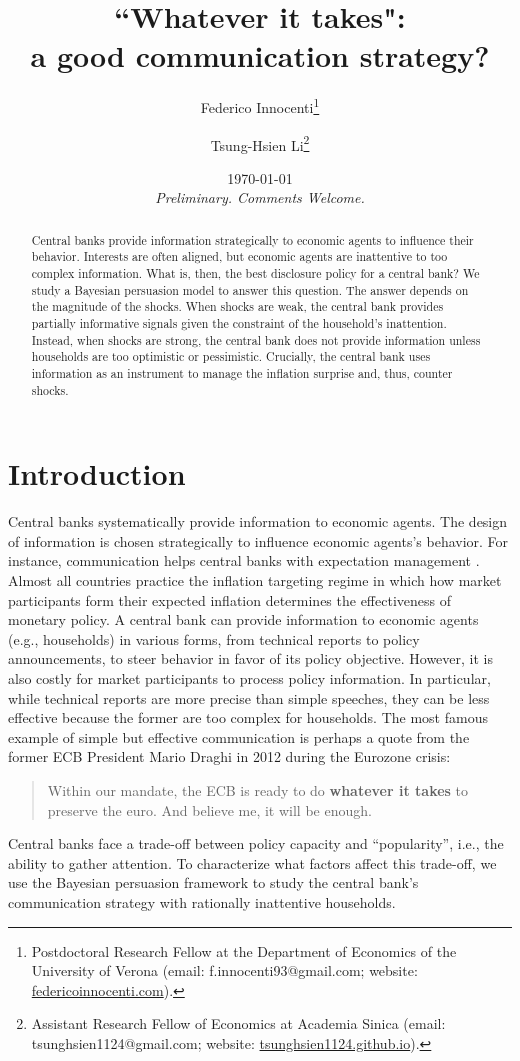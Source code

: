 \documentclass[12pt,a4paper]{article}
\title{``Whatever it takes": \\ a good communication strategy?}
\author{Federico Innocenti\thanks{Postdoctoral Research Fellow at the Department of Economics of the University of Verona (email: f.innocenti93@gmail.com; website: \href{https://federicoinnocenti.com/}{federicoinnocenti.com}).} \and Tsung-Hsien Li\thanks{Assistant Research Fellow of Economics at Academia Sinica (email: tsunghsien1124@gmail.com; website: \href{https://tsunghsien1124.github.io/}{tsunghsien1124.github.io}).}}
\date{\today \\ \medskip
\emph{Preliminary. Comments Welcome.}}
\begin{document}
\setlength{\parskip}{2mm}

\maketitle

\begin{abstract}
Central banks provide information strategically to economic agents to influence their behavior. Interests are often aligned, but economic agents are inattentive to too complex information. What is, then, the best disclosure policy for a central bank? We study a Bayesian persuasion model to answer this question. The answer depends on the magnitude of the shocks. When shocks are weak, the central bank provides partially informative signals given the constraint of the household's inattention. Instead, when shocks are strong, the central bank does not provide information unless households are too optimistic or pessimistic. Crucially, the central bank uses information as an instrument to manage the inflation surprise and, thus, counter shocks.
\end{abstract}

\newpage

\section{Introduction} \label{sec:intro}

Central banks systematically provide information to economic agents. The design of information is chosen strategically to influence economic agents's behavior. For instance, communication helps central banks with expectation management \citep{Casiraghi2022}. Almost all countries practice the inflation targeting regime in which how market participants form their expected inflation determines the effectiveness of monetary policy. A central bank can provide information to economic agents (e.g., households) in various forms, from technical reports to policy announcements, to steer behavior in favor of its policy objective. However, it is also costly for market participants to process policy information. In particular, while technical reports are more precise than simple speeches, they can be less effective because the former are too complex for households.
The most famous example of simple but effective communication is perhaps a quote from the former ECB President Mario Draghi in 2012 during the Eurozone crisis:
\begin{quote}
Within our mandate, the ECB is ready to do \textbf{whatever it takes} to preserve the euro. And believe me, it will be enough.
\end{quote}
Central banks face a trade-off between policy capacity and ``popularity'', i.e., the ability to gather attention. To characterize what factors affect this trade-off, we use the Bayesian persuasion framework to study the central bank's communication strategy with rationally inattentive households.
\end{document}
